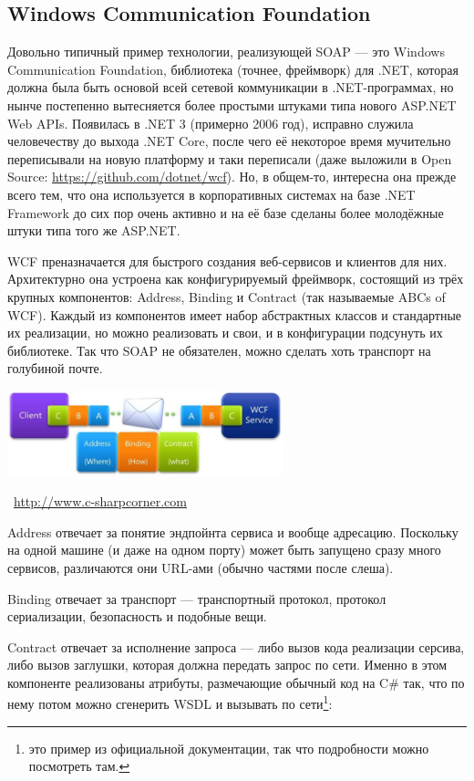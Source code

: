 \documentclass[a5paper]{article}
\newcommand{\attribution}[1] {
    \vspace{-5mm}\begin{flushright}\begin{scriptsize}\textcolor{gray}{\textcopyright\, #1}\end{scriptsize}\end{flushright}
}
\begin{document}
\subsection{Windows Communication Foundation}

Довольно типичный пример технологии, реализующей SOAP --- это Windows Communication Foundation, библиотека (точнее, фреймворк) для .NET, которая должна была быть основой всей сетевой коммуникации в .NET-программах, но нынче постепенно вытесняется более простыми штуками типа нового ASP.NET Web APIs. Появилась в .NET 3 (примерно 2006 год), исправно служила человечеству до выхода .NET Core, после чего её некоторое время мучительно переписывали на новую платформу и таки переписали (даже выложили в Open Source: \url{https://github.com/dotnet/wcf}). Но, в общем-то, интересна она прежде всего тем, что она используется в корпоративных системах на базе .NET Framework до сих пор очень активно и на её базе сделаны более молодёжные штуки типа того же ASP.NET.

WCF преназначается для быстрого создания веб-сервисов и клиентов для них. Архитектурно она устроена как конфигурируемый фреймворк, состоящий из трёх крупных компонентов: Address, Binding и Contract (так называемые ABCs of WCF). Каждый из компонентов имеет набор абстрактных классов и стандартные их реализации, но можно реализовать и свои, и в конфигурации подсунуть их библиотеке. Так что SOAP не обязателен, можно сделать хоть транспорт на голубиной почте.

\begin{center}
    \includegraphics[width=0.6\textwidth]{wcf.png}
    \attribution{\url{http://www.c-sharpcorner.com}}
\end{center}

Address отвечает за понятие эндпойнта сервиса и вообще адресацию. Поскольку на одной машине (и даже на одном порту) может быть запущено сразу много сервисов, различаются они URL-ами (обычно частями после слеша).

Binding отвечает за транспорт --- транспортный протокол, протокол сериализации, безопасность и подобные вещи.

Contract отвечает за исполнение запроса --- либо вызов кода реализации серсива, либо вызов заглушки, которая должна передать запрос по сети. Именно в этом компоненте реализованы атрибуты, размечающие обычный код на C\# так, что по нему потом можно сгенерить WSDL и вызывать по сети\footnote{это пример из официальной документации, так что подробности можно посмотреть там.}: 
\end{document}
